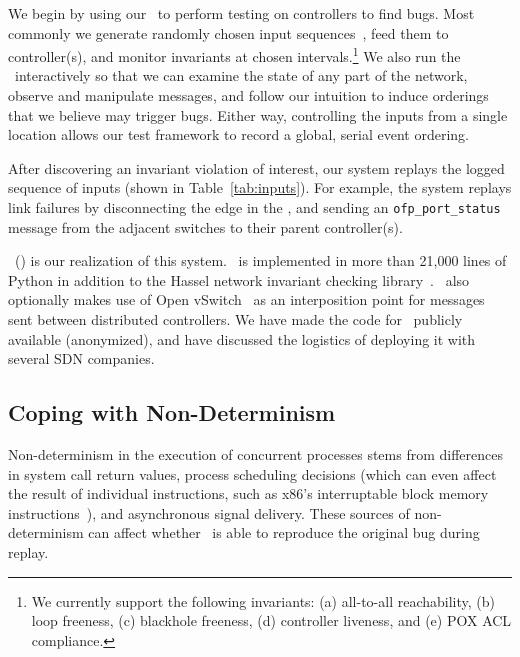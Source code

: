We begin by using our \tester~to perform testing on controllers to find
bugs. Most commonly we generate randomly chosen input
sequences~\cite{Miller:1990:ESR:96267.96279}, feed them to controller(s),
and monitor
invariants at chosen intervals.\footnote{We currently support the following invariants:
  (a) all-to-all reachability, (b) loop freeness, (c) blackhole freeness, (d) controller
liveness, and (e) POX ACL compliance.
}
We also run the \tester~interactively
so that we can examine the state of any part of the network,
observe and manipulate messages, and follow our
intuition to induce orderings that we believe may trigger bugs.
Either way, controlling the inputs from a single location
allows our test framework to record a global, serial
event ordering.

After discovering an invariant violation of interest, our system replays
the logged sequence of inputs (shown in Table~\ref{tab:inputs}). For example,
the system replays link failures
by disconnecting the edge in the \tester, and sending an
\verb=ofp_port_status=~\cite{openflow} message from the adjacent switches to their parent controller(s).

\projectname~(\projectmeaning) is our realization of this system.
\projectname~is implemented in more than 21,000 lines of Python in
addition to the Hassel network invariant checking library~\cite{hsa}.
\projectname~also optionally makes use of Open vSwitch~\cite{pfaff2009extending} as an interposition point for
messages sent between distributed controllers. We have
made the code
for \projectname~publicly available (anonymized), %
and have discussed the logistics of deploying it with several SDN companies.


\subsection{Coping with Non-Determinism}

Non-determinism in the execution of concurrent processes stems from
differences in system call return values, process scheduling decisions (which can
even affect the result of individual instructions, such as x86's
interruptable block memory instructions~\cite{Dunlap:2002:REI:844128.844148}),
and asynchronous signal
delivery. These sources of non-determinism can affect whether \projectname~is
able to reproduce the original bug during replay.

